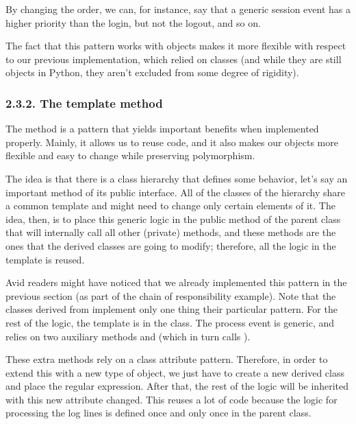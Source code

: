 \documentclass[a4paper,10pt,english]{sphinxmanual}
\begin{document}
By changing the order, we can, for instance, say that a generic session event has a higher
priority than the login, but not the logout, and so on.

The fact that this pattern works with objects makes it more flexible with respect to our
previous implementation, which relied on classes (and while they are still objects in Python,
they aren’t excluded from some degree of rigidity).


\subsubsection{2.3.2. The template method}
\label{\detokenize{chapters/9_design_patterns/index:the-template-method}}
The  method is a pattern that yields important benefits when implemented
properly. Mainly, it allows us to reuse code, and it also makes our objects more flexible and
easy to change while preserving polymorphism.

The idea is that there is a class hierarchy that defines some behavior, let’s say an important
method of its public interface. All of the classes of the hierarchy share a common template
and might need to change only certain elements of it. The idea, then, is to place this generic
logic in the public method of the parent class that will internally call all other (private)
methods, and these methods are the ones that the derived classes are going to modify;
therefore, all the logic in the template is reused.

Avid readers might have noticed that we already implemented this pattern in the previous
section (as part of the chain of responsibility example). Note that the classes derived
from  implement only one thing their particular pattern. For the rest of the logic, the
template is in the  class. The process event is generic, and relies on two auxiliary
methods  and  (which in turn calls ).

These extra methods rely on a class attribute pattern. Therefore, in order to extend this with
a new type of object, we just have to create a new derived class and place the regular
expression. After that, the rest of the logic will be inherited with this new attribute changed.
This reuses a lot of code because the logic for processing the log lines is defined once and
only once in the parent class.
\end{document}
